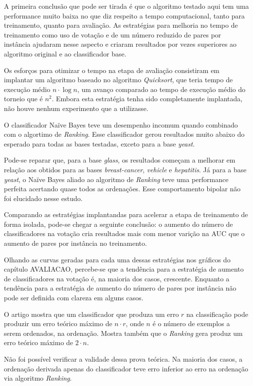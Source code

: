 A primeira conclusão que pode ser tirada é que o algoritmo testado aqui tem uma performance muito baixa no que diz respeito a tempo computacional, tanto para treinamento, quanto para avaliação. As estratégias para melhoria no tempo de treinamento como uso de votação e de um número reduzido de pares por instância ajudaram nesse aspecto e criaram resultados por vezes superiores ao algoritmo original e ao classificador base.

Os esforços para otimizar o tempo na etapa de avaliação consistiram em implantar um algoritmo baseado no algoritmo \emph{Quicksort}, que teria tempo de execução médio $n\cdot\log{n}$, um avanço comparado ao tempo de execução médio do torneio que é $n^2$. Embora esta estratégia tenha sido completamente implantada, não houve nenhum experimento que a utilizasse.

O classificador Naïve Bayes teve um desempenho incomum quando combinado com o algortimo de \emph{Ranking}. Esse classificador gerou resultados muito abaixo do esperado para todas as bases testadas, exceto para a base \emph{yeast}.

Pode-se reparar que, para a base \emph{glass}, os resultados começam a melhorar em relação aos obtidos para as bases \emph{breast-cancer}, \emph{vehicle} e \emph{hepatitis}. Já para a base \emph{yeast}, o Naïve Bayes aliado ao algoritmo de \emph{Ranking} teve uma performance perfeita acertando quase todos as ordenações. Esse comportamento bipolar não foi elucidado nesse estudo.

Comparando as estratégias implantandas para acelerar a etapa de treinamento de forma isolada, pode-se chegar a seguinte conclusão: o aumento do número de classificadores na votação cria resultados mais com menor varição na AUC que o aumento de pares por instância no treinamento.

Olhando as curvas geradas para cada uma dessas estratégias nos gráficos do capítulo {{AVALIACAO}}, percebe-se que a tendência para a estratégia de aumento de classificadores na votação é, na maioria dos casos, crescente. Enquanto a tendência para a estratégia de aumento do número de pares por instância não pode ser definida com clareza em alguns casos.

O artigo \cite{langford08} mostra que um classificador que produza um erro $r$ na classificação pode produzir um erro teórico máximo de $n \cdot r$, onde $n$ é o número de exemplos a serem ordenados, na ordenação. Mostra também que o \emph{Ranking} gera produz um erro teórico máximo de $2 \cdot n$.

Não foi possível verificar a validade dessa prova teórica. Na maioria dos casos, a ordenação derivada apenas do classificador teve erro inferior ao erro na ordenação via algoritmo \emph{Ranking}.